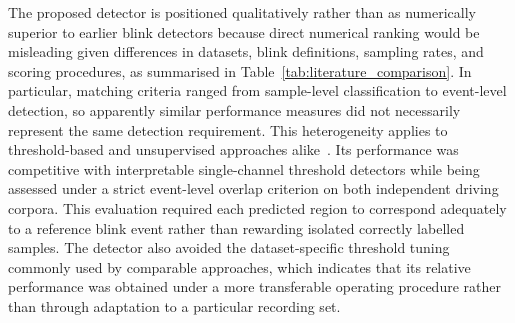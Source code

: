 
The proposed detector is positioned qualitatively rather than as numerically superior to earlier blink detectors because direct numerical ranking would be misleading given differences in datasets, blink definitions, sampling rates, and scoring procedures, as summarised in Table~\ref{tab:literature_comparison}. In particular, matching criteria ranged from sample-level classification to event-level detection, so apparently similar performance measures did not necessarily represent the same detection requirement. This heterogeneity applies to threshold-based and unsupervised approaches alike~\citep{chang2016detection,tran2021detection,kleifges2017blinker,agarwal2019blink,jefri2022eye,cao2021unsupervised,rashida2023quantitative}. Its performance was competitive with interpretable single-channel threshold detectors while being assessed under a strict event-level overlap criterion on both independent driving corpora. This evaluation required each predicted region to correspond adequately to a reference blink event rather than rewarding isolated correctly labelled samples. The detector also avoided the dataset-specific threshold tuning commonly used by comparable approaches, which indicates that its relative performance was obtained under a more transferable operating procedure rather than through adaptation to a particular recording set.
